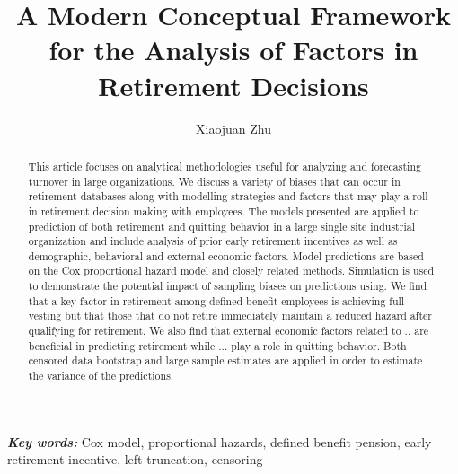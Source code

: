 \documentclass[12pt,letterpaper]{article}
\title{A Modern Conceptual Framework for the Analysis of Factors in Retirement Decisions}
\author{Xiaojuan Zhu}
\providecommand{\keywords}[1]{\textbf{\textit{Key words:}} #1} %
\begin{document}
\maketitle

\begin{abstract}
This article focuses on analytical methodologies useful for analyzing and forecasting turnover in large organizations.  We discuss a variety of biases that can occur in retirement databases along with modelling strategies and factors that may play a roll in retirement decision making with employees. The models presented are applied to prediction of both retirement and quitting behavior in a large single site industrial organization and include analysis of prior early retirement incentives as well as demographic, behavioral and external economic factors. Model predictions are based on the Cox proportional hazard model and closely related methods. Simulation is used to demonstrate the potential impact of sampling biases on predictions using. We find that a key factor in retirement among defined benefit employees is achieving full vesting but that those that do not retire immediately maintain a reduced hazard after qualifying for retirement. We also find that external economic factors related to .. are beneficial in predicting retirement while ... play a role in quitting behavior.  Both censored data bootstrap and large sample estimates are applied in order to estimate the variance of the predictions.

\end{abstract}

\keywords {Cox model, proportional hazards, defined benefit pension, early retirement incentive, left truncation, censoring}


\end{document}
